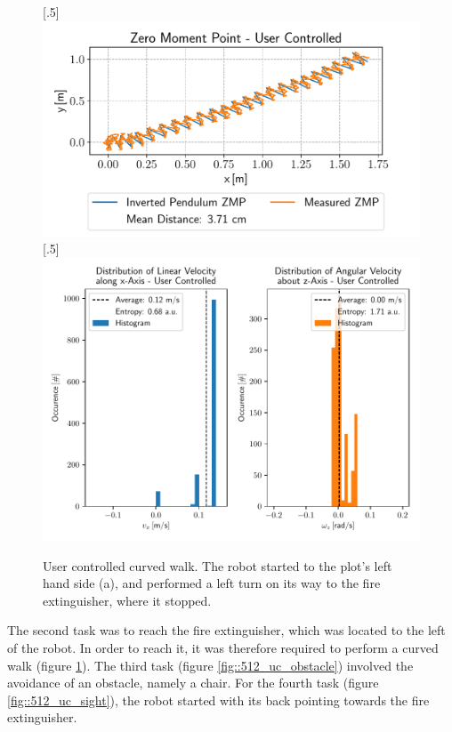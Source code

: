 \begin{figure}[h!]
	[.5\linewidth]{\includegraphics[scale=.45]{chapters/05_experiments/01_user_controlled_walking/02_test_environment/curved_walk_01_zmp.pdf}}
	[.5\linewidth]{\includegraphics[scale=.45]{chapters/05_experiments/01_user_controlled_walking/02_test_environment/curved_walk_01_entropy.pdf}}
	\caption{User controlled curved walk. The robot started to the plot's left hand side (a), and performed a left turn on its way to the fire extinguisher, where it stopped.}
	\label{fig::512_uc_curved}
\end{figure} 
The second task was to reach the fire extinguisher, which was located to the left of the robot. In order to reach it, it was therefore required to perform a curved walk (figure \ref{fig::512_uc_curved}). The third task (figure \ref{fig::512_uc_obstacle}) involved the avoidance of an obstacle, namely a chair. For the fourth task (figure \ref{fig::512_uc_sight}), the robot started with its back pointing towards the fire extinguisher.
